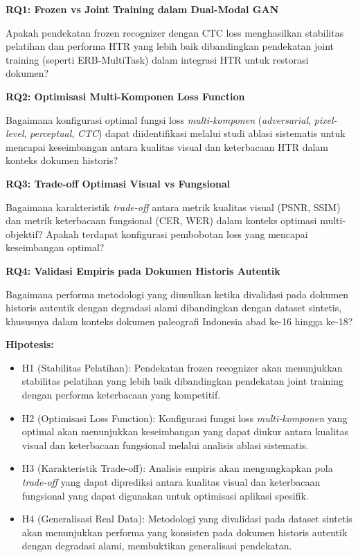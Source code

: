 \documentclass[12pt,a4paper]{book}
\begin{document}
\textbf{RQ1: Frozen vs Joint Training dalam Dual-Modal GAN}

Apakah pendekatan frozen recognizer dengan CTC loss menghasilkan stabilitas pelatihan dan performa HTR yang lebih baik dibandingkan pendekatan joint training (seperti ERB-MultiTask) dalam integrasi HTR untuk restorasi dokumen?

\textbf{RQ2: Optimisasi Multi-Komponen Loss Function}

Bagaimana konfigurasi optimal fungsi loss \textit{multi-komponen} (\textit{adversarial}, \textit{pixel-level}, \textit{perceptual}, \textit{CTC}) dapat diidentifikasi melalui studi ablasi sistematis untuk mencapai keseimbangan antara kualitas visual dan keterbacaan HTR dalam konteks dokumen historis?

\textbf{RQ3: Trade-off Optimasi Visual vs Fungsional}

Bagaimana karakteristik \textit{trade-off} antara metrik kualitas visual (PSNR, SSIM) dan metrik keterbacaan fungsional (CER, WER) dalam konteks optimasi multi-objektif? Apakah terdapat konfigurasi pembobotan loss yang mencapai keseimbangan optimal?

\textbf{RQ4: Validasi Empiris pada Dokumen Historis Autentik}

Bagaimana performa metodologi yang diusulkan ketika divalidasi pada dokumen historis autentik dengan degradasi alami dibandingkan dengan dataset sintetis, khususnya dalam konteks dokumen paleografi Indonesia abad ke-16 hingga ke-18?

\vspace{0.5ex}
\noindent\textbf{Hipotesis:}

\begin{itemize}
 \item H1 (Stabilitas Pelatihan): Pendekatan frozen recognizer akan menunjukkan stabilitas pelatihan yang lebih baik dibandingkan pendekatan joint training dengan performa keterbacaan yang kompetitif.

 \item H2 (Optimisasi Loss Function): Konfigurasi fungsi loss \textit{multi-komponen} yang optimal akan menunjukkan keseimbangan yang dapat diukur antara kualitas visual dan keterbacaan fungsional melalui analisis ablasi sistematis.

 \item H3 (Karakteristik Trade-off): Analisis empiris akan mengungkapkan pola \textit{trade-off} yang dapat diprediksi antara kualitas visual dan keterbacaan fungsional yang dapat digunakan untuk optimisasi aplikasi spesifik.

 \item H4 (Generalisasi Real Data): Metodologi yang divalidasi pada dataset sintetis akan menunjukkan performa yang konsisten pada dokumen historis autentik dengan degradasi alami, membuktikan generalisasi pendekatan.
\end{itemize}
\end{document}
